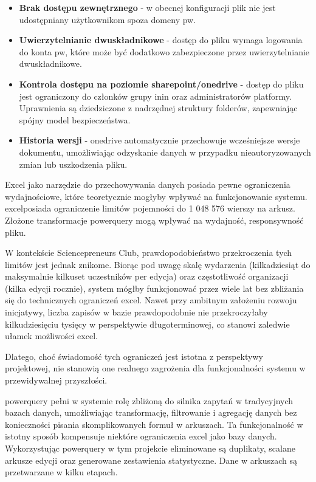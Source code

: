 \begin{itemize}
    \item \textbf{Brak dostępu zewnętrznego} - w obecnej konfiguracji plik nie jest udostępniany użytkownikom spoza domeny \gls{pw}. \cite{Microsoft365Groups2025}
    \item \textbf{Uwierzytelnianie dwuskładnikowe} - dostęp do pliku wymaga logowania do konta \gls{pw}, które może być dodatkowo zabezpieczone przez uwierzytelnianie dwuskładnikowe. \cite{kastwal2023}
    \item \textbf{Kontrola dostępu na poziomie \gls{sharepoint}/\gls{onedrive}} - dostęp do pliku jest ograniczony do członków grupy \gls{inin} oraz administratorów platformy. Uprawnienia są dziedziczone z nadrzędnej struktury folderów, zapewniając spójny model bezpieczeństwa. \cite{Microsoft365Groups2025}
    \item \textbf{Historia wersji} - \gls{onedrive} automatycznie przechowuje wcześniejsze wersje dokumentu, umożliwiając odzyskanie danych w przypadku nieautoryzowanych zmian lub uszkodzenia pliku. \cite{microsoft_office_versions_2025}
\end{itemize}

Excel jako narzędzie do przechowywania danych posiada pewne ograniczenia wydajnościowe, które teoretycznie mogłyby wpływać na funkcjonowanie systemu. \gls{excel}posiada ograniczenie limitów pojemności do 1 048 576 wierszy na arkusz.\cite{microsoft_excel_specs_2025} Złożone transformacje \gls{powerquery} mogą wpływać na wydajność, responsywność pliku.

W kontekście Sciencepreneurs Club, prawdopodobieństwo przekroczenia tych limitów jest jednak znikome. Biorąc pod uwagę skalę wydarzenia (kilkadziesiąt do maksymalnie kilkuset uczestników per edycja) oraz częstotliwość organizacji (kilka edycji rocznie), system mógłby funkcjonować przez wiele lat bez zbliżania się do technicznych ograniczeń \gls{excel}. Nawet przy ambitnym założeniu rozwoju inicjatywy, liczba zapisów w bazie prawdopodobnie nie przekroczyłaby kilkudziesięciu tysięcy w perspektywie długoterminowej, co stanowi zaledwie ułamek możliwości \gls{excel}.

Dlatego, choć świadomość tych ograniczeń jest istotna z perspektywy projektowej, nie stanowią one realnego zagrożenia dla funkcjonalności systemu w przewidywalnej przyszłości.

\gls{powerquery} pełni w systemie rolę zbliżoną do silnika zapytań w tradycyjnych bazach danych, umożliwiając transformację, filtrowanie i agregację danych bez konieczności pisania skomplikowanych formuł w arkuszach. Ta funkcjonalność w istotny sposób kompensuje niektóre ograniczenia \gls{excel} jako bazy danych. Wykorzystując \gls{powerquery} w tym projekcie eliminowane są duplikaty, scalane arkusze edycji oraz generowane zestawienia statystyczne. Dane w arkuszach są przetwarzane w kilku etapach. \cite{microsoft_power_query_2025}

